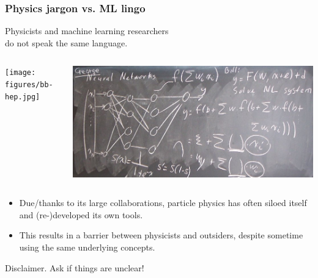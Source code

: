 \documentclass{beamer}
\begin{document}
\begin{frame}
    \frametitle{Physics jargon vs. ML lingo}

    \begin{center}
        Physicists and machine learning researchers\\
        do not speak the same language.
    \end{center}

    \begin{columns}
        \begin{column}{0.4\textwidth}
            \centering
            \texttt{[image: figures/bb-hep.jpg]}
        \end{column}
        \begin{column}{0.5\textwidth}
            \centering
            \includegraphics[width=\textwidth]{figures/bb-ml.jpg}
        \end{column}
    \end{columns}

    \vspace{0.5cm}


    {\scriptsize
    \begin{itemize}
        \item Due/thanks to its large collaborations, particle physics has often siloed itself and (re-)developed its own tools.
        \item This results in a barrier between physicists and outsiders, despite sometime using the same underlying concepts.
    \end{itemize}
    }

    \vspace{0.5cm}


    {\color{red}Disclaimer.} Ask if things are unclear!

\end{frame}
\end{document}
